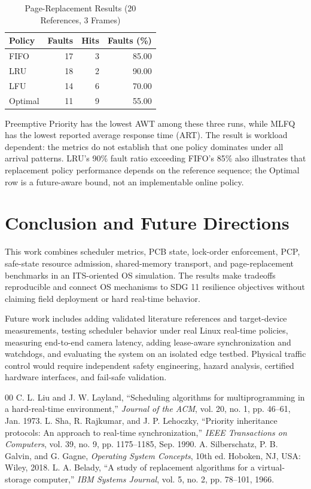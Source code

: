\documentclass[conference]{IEEEtran}
\begin{document}
\begin{table}[t]
\caption{Page-Replacement Results (20 References, 3 Frames)}
\label{tab:pages}
\centering
\begin{tabular}{lrrr}
\toprule
Policy & Faults & Hits & Faults (\%) \\
\midrule
FIFO & 17 & 3 & 85.00 \\
LRU & 18 & 2 & 90.00 \\
LFU & 14 & 6 & 70.00 \\
Optimal & 11 & 9 & 55.00 \\
\bottomrule
\end{tabular}
\end{table}

Preemptive Priority has the lowest AWT among these three runs, while MLFQ has
the lowest reported average response time (ART). The result is workload
dependent: the metrics do not establish that one policy dominates under all
arrival patterns. LRU's 90\% fault ratio exceeding FIFO's 85\% also illustrates
that replacement policy performance depends on the reference sequence; the
Optimal row is a future-aware bound, not an implementable online policy.

\section{Conclusion and Future Directions}
This work combines scheduler metrics, PCB state, lock-order enforcement, PCP,
safe-state resource admission, shared-memory transport, and page-replacement
benchmarks in an ITS-oriented OS simulation. The results make tradeoffs
reproducible and connect OS mechanisms to SDG 11 resilience objectives without
claiming field deployment or hard real-time behavior.

Future work includes adding validated literature references and target-device
measurements, testing scheduler behavior under real Linux real-time policies,
measuring end-to-end camera latency, adding lease-aware synchronization and
watchdogs, and evaluating the system on an isolated edge testbed. Physical
traffic control would require independent safety engineering, hazard analysis,
certified hardware interfaces, and fail-safe validation.

\begin{thebibliography}{00}
 C. L. Liu and J. W. Layland, ``Scheduling algorithms for
multiprogramming in a hard-real-time environment,'' \emph{Journal of the ACM},
vol. 20, no. 1, pp. 46--61, Jan. 1973.
 L. Sha, R. Rajkumar, and J. P. Lehoczky, ``Priority
inheritance protocols: An approach to real-time synchronization,''
\emph{IEEE Transactions on Computers}, vol. 39, no. 9, pp. 1175--1185,
Sep. 1990.
 A. Silberschatz, P. B. Galvin, and G. Gagne,
\emph{Operating System Concepts}, 10th ed. Hoboken, NJ, USA: Wiley, 2018.
 L. A. Belady, ``A study of replacement algorithms for a
virtual-storage computer,'' \emph{IBM Systems Journal}, vol. 5, no. 2,
pp. 78--101, 1966.
\end{thebibliography}
\end{document}
